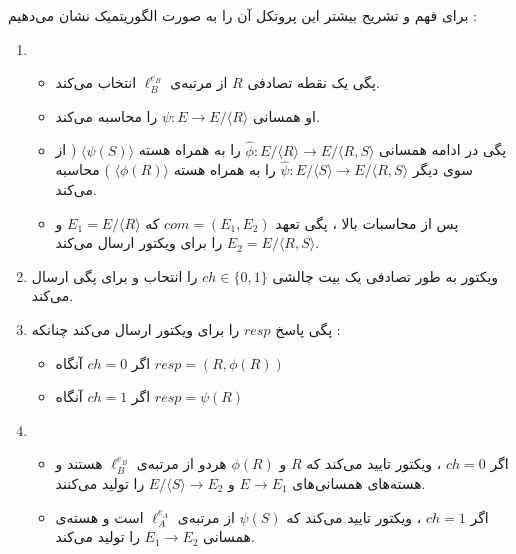 \documentclass[12pt,a4paper]{article}
\begin{document}
برای فهم و تشریح بیشتر این پروتکل آن را به صورت الگوریتمیک نشان می‌دهیم :
\begin{enumerate}
	
	\item {
\begin{itemize}
	\item 
	پگی یک نقطه تصادفی 
	$R$
	از مرتبه‌ی
	$\ell_B^{e_B}$
	انتخاب می‌کند.
	
	\item 
	او همسانی
	$\psi : E \rightarrow E / \langle R \rangle$
	را محاسبه می‌کند.
	\item 
	پگی در ادامه همسانی
	$\hat{\phi} : E / \langle R \rangle \rightarrow  E / \langle R,S \rangle $
	را به همراه هسته 
	$\langle \psi(S) \rangle$
(
از سوی دیگر 
	$\hat{\psi} : E / \langle S \rangle \rightarrow  E / \langle R,S \rangle $
را به همراه هسته 
$\langle \phi(R) \rangle$
)
 محاسبه می‌کند.
 \item 
 پس از محاسبات بالا ، پگی تعهد 
 $com = (E_1 , E_2)$
 که 
 $E_1 = E / \langle R \rangle$
 و
 $E_2 = E / \langle R,S \rangle$
‌ را برای ویکتور ارسال می‌کند.
 
\end{itemize}	
} %

\item 
ویکتور به طور تصادفی  یک بیت چالشی 
$ch \in \{0,1\}$
را انتحاب و برای پگی ارسال می‌کند.
\item 
پگی پاسخ 
$resp$
را برای ویکتور ارسال می‌کند چنانکه :
\begin{itemize}
	\item
	اگر 
	$ch = 0$
	آنگاه
	$resp = (R,\phi(R))$
	
	\item
	اگر 
	$ch = 1$
	آنگاه
	$resp = \psi(R)$
	
\end{itemize}
\item {
\begin{itemize}
	\item 
	اگر
	$ch = 0 $
	، ویکتور تایید می‌کند که
	$R$
	و
	$\phi(R)$
	هردو از مرتبه‌ی 
	$\ell_B^{e_B}$
	هستند و هسته‌های همسانی‌های
	$E \rightarrow E_1$
	و 
	$E/ \langle S \rangle \rightarrow E_2$
	را تولید می‌کنند.
	\item 
	اگر 
	$ch = 1 $
	، ویکتور تایید می‌کند که 
	$\psi(S)$
	از مرتبه‌ی
	$\ell_A^{e_A}$
	است و هسته‌ی همسانی 
	$E_1 \rightarrow E_2$
	را تولید می‌کند.
\end{itemize}
} %
	
	
\end{enumerate}
\end{document}
